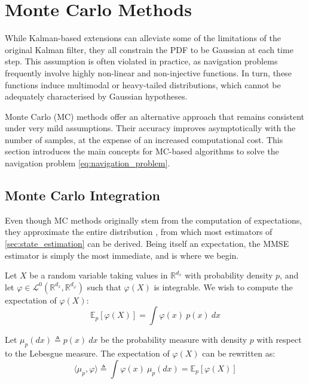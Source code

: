 \section{Monte Carlo Methods}\label{sec:Monte_Carlo}

While Kalman-based extensions can alleviate some of the limitations of the original Kalman filter, they all constrain the PDF to be Gaussian at each time step. This assumption is often violated in practice, as navigation problems frequently involve highly non-linear and non-injective functions. In turn, these functions induce multimodal or heavy-tailed distributions, which cannot be adequately characterised by Gaussian hypotheses.

Monte Carlo (MC) methods \cite{bib:Metropolis,bib:SOD333-MC} offer an alternative approach that remains consistent under very mild assumptions. Their accuracy improves asymptotically with the number of samples, at the expense of an increased computational cost. This section introduces the main concepts for MC-based algorithms to solve the navigation problem \eqref{eq:navigation_problem}.

\subsection{Monte Carlo Integration}

Even though MC methods originally stem from the computation of expectations, they approximate the entire distribution \cite{bib:MC-integration}, from which most estimators of \cref{sec:state_estimation} can be derived. Being itself an expectation, the MMSE estimator is simply the most immediate, and is where we begin.

Let $X$ be a random variable taking values in $\mathbb{R}^{d_x}$ with probability density $p$, and let $\varphi\in\mathcal{L}^0(\mathbb{R}^{d_x},\mathbb{R}^{d_{\varphi}})$ such that $\varphi(X)$ is integrable. We wish to compute the expectation of $\varphi(X)$:
\begin{equation}
	\mathbb{E}_p[\varphi(X)]=\int{\varphi(x)\:p(x)\:dx}
\end{equation}

Let $\mu_p(dx)\triangleq p(x)\:dx$ be the probability measure with density $p$ with respect to the Lebesgue measure. The expectation of $\varphi(X)$ can be rewritten as:
\begin{equation}
	\langle\mu_p,\varphi\rangle\triangleq\int{\varphi(x)\:\mu_p(dx)}=\mathbb{E}_p[\varphi(X)]\label{eq:varphi_expectation_mu}
\end{equation}

